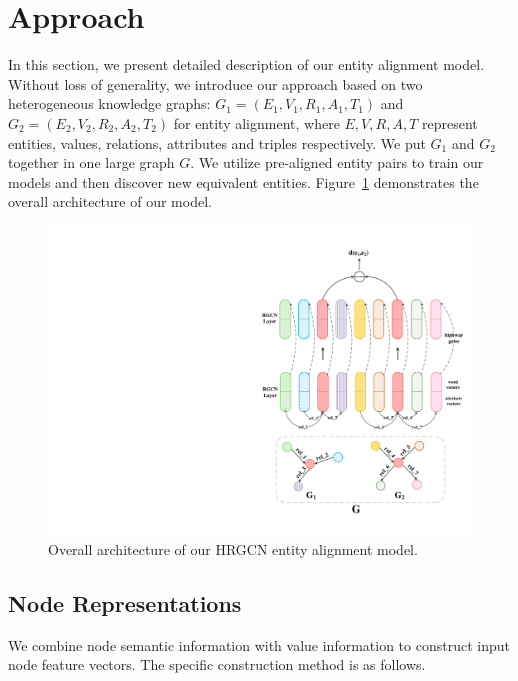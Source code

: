 
	\section{Approach}
	\label{section:app}
	In this section, we present detailed description of our entity alignment model. Without loss of generality, we introduce our approach based on two heterogeneous knowledge graphs: $G_1 = (E_1,V_1,R_1,A_1,T_1)$ and $G_2 = (E_2,V_2,R_2,A_2,T_2)$ for entity alignment, where $E,V,R,A,T$ represent entities, values, relations, attributes and triples respectively.
	We put $G_1$ and $G_2$ together in one large graph $G$. We utilize pre-aligned entity pairs to train our models and then discover new equivalent entities. Figure~\ref{all} demonstrates the overall architecture of our model.
	
	
	\begin{figure}
		\begin{center}
			\includegraphics[width=0.8\linewidth]{graph2.pdf}
			\caption{Overall architecture of our HRGCN entity alignment model.}
			\label{all}
		\end{center}
	\end{figure}
	
	\subsection{Node Representations}
	\label{subsection:Node Representations}
	We combine node semantic information with value information to construct input node feature vectors. The specific construction method is as follows.
	
